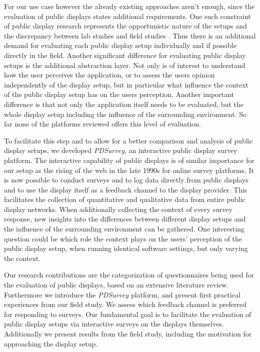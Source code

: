 	For our use case however the already existing approaches aren't enough, since the evaluation of public displays states additional requirements.
	One such constraint of public display research represents the opportunistic nature of the setups and the discrepancy between lab studies and field studies \cite{Ojala2011}. Thus there is an additional demand for evaluating each public display setup individually and if possible directly in the field. Another significant difference for evaluating public display setups is the additional abstraction layer. Not only is of interest to understand how the user perceives the application, or to assess the users opinion independently of the display setup, but in particular what influence the context of the public display setup has on the users perception. Another important difference is that not only the application itself needs to be evaluated, but the whole display setup including the influence of the surrounding environment. So far none of the platforms reviewed offers this level of evaluation.


	To facilitate this step and to allow for a better comparison and analysis of public display setups, we developed \textit{PDSurvey}, an interactive public display survey platform. The interactive capability of public displays is of similar importance for our setup as the rising of the web in the late 1990s for online survey platforms. It is now possible to conduct surveys and to log data directly from public displays and to use the display itself as a feedback channel to the display provider.
	This facilitates the collection of quantitative and qualitative data from entire public display networks. When additionally collecting the context of every survey response, new insights into the differences between different display setups and the influence of the surrounding environment can be gathered. One interesting question could be which role the context plays on the users' perception of the public display setup, when running identical software settings, but only varying the context.


	Our research contributions are the categorization of questionnaires being used for the evaluation of public displays, based on an extensive literature review. Furthermore we introduce the \textit{PDSurvey} platform, and present first practical experiences from our field study. We assess which feedback channel is preferred for responding to surveys. Our fundamental goal is to facilitate the evaluation of public display setups via interactive surveys on the displays themselves. Additionally we present results from the field study, including the motivation for approaching the display setup.


